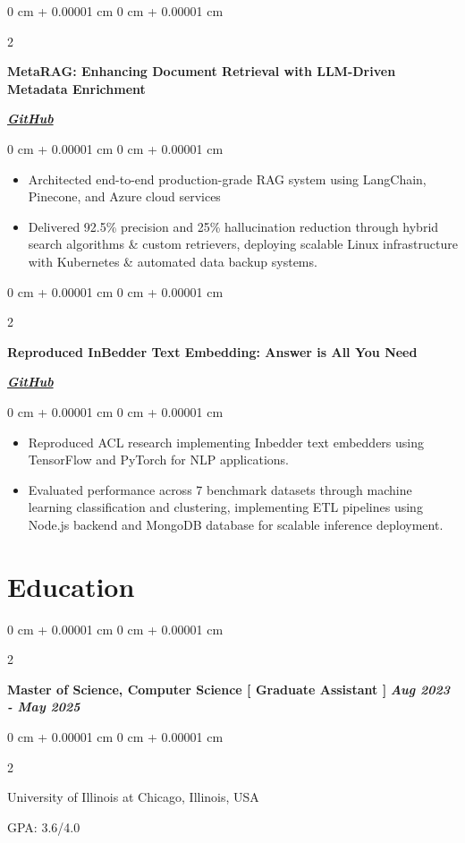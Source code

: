 \documentclass[10pt, letterpaper]{article}
\newenvironment{highlights}{
    \begin{itemize}[
        topsep=0.10 cm,
        parsep=0.10 cm,
        partopsep=0pt,
        itemsep=0pt,
        leftmargin=0 cm + 10pt
    ]
}{
    \end{itemize}
} %
\newenvironment{onecolentry}{
    \begin{adjustwidth}{
        0 cm + 0.00001 cm
    }{
        0 cm + 0.00001 cm
    }
}{
    \end{adjustwidth}
} %
\newenvironment{twocolentry}[2][]{
    \onecolentry
    \def\secondColumn{#2}
    \setcolumnwidth{\fill, 4.5 cm}
    \begin{paracol}{2}
}{
    \switchcolumn \raggedleft \secondColumn
    \end{paracol}
    \endonecolentry
} %
\begin{document}
\begin{twocolentry}{
           \href{https://github.com/PranavMishra17/Metadata-Enrichment-with-LLMs-for-RAGs-Internal-Knowledge-Retrieval}{\textbf{\textit{GitHub}}}
       }
           \textbf{MetaRAG: Enhancing Document Retrieval with LLM-Driven Metadata Enrichment}
\end{twocolentry}
\vspace{0.1 cm}
\begin{onecolentry}
   \begin{highlights}
\item Architected end-to-end production-grade RAG system using LangChain, Pinecone, and Azure cloud services
   \end{highlights}
   \begin{highlights}
\item Delivered 92.5\% precision and 25\% hallucination reduction through hybrid search algorithms \& custom retrievers, deploying
scalable Linux infrastructure with Kubernetes \& automated data backup systems.
   \end{highlights}
\end{onecolentry}

\vspace{0.1 cm}

\begin{twocolentry}{
           \href{https://github.com/Hjhirp/InBedder}{\textbf{\textit{GitHub}}}
       }
           \textbf{Reproduced InBedder Text Embedding: Answer is All You Need}
\end{twocolentry}
\vspace{0.10 cm}
\begin{onecolentry}
   \begin{highlights}
\item Reproduced ACL research implementing Inbedder text embedders using TensorFlow and PyTorch for NLP applications.
   \end{highlights}
   \begin{highlights}
\item Evaluated performance across 7 benchmark datasets through machine learning classification and clustering, implementing ETL pipelines using Node.js backend and MongoDB database for scalable inference deployment.
   \end{highlights}
\end{onecolentry}


\section{Education}
        \begin{twocolentry}{
            \textit{\textbf{Aug 2023 - May 2025}}
        }
            \textbf{Master of Science, Computer Science [ Graduate Assistant ]}\end{twocolentry}
            \begin{twocolentry}
            {GPA: 3.6/4.0}
    University of Illinois at Chicago, Illinois, USA 
            \end{twocolentry}
            
\end{document}
